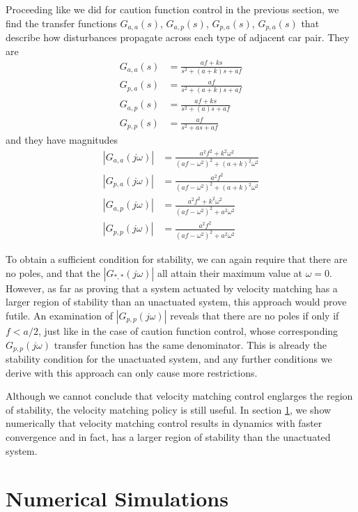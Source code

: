 \documentclass[10pt,twocolumn]{article}
\theoremstyle{ss}
\begin{document}
Proceeding like we did for caution function control in the previous section, we find the transfer functions $G_{a,a}(s)$, $G_{a,p}(s)$, $G_{p,a}(s)$, $G_{p,a}(s)$ that describe how disturbances propagate across each type of adjacent car pair. They are
\begin{align}
G_{a,a}(s) &= \frac{af + ks}{s^2 + (a+k)s + af}\\
G_{p,a}(s) &= \frac{af}{s^2 + (a+k)s + af}\\
G_{a,p}(s) &= \frac{af + ks}{s^2 + (a)s + af}\\
G_{p,p}(s) &= \frac{af}{s^2 + as + af}
\end{align}
and they have magnitudes
\begin{align}
|G_{a,a}(j\omega)| &= \frac{a^2f^2 + k^2\omega^2}{(af - \omega^2)^2 + (a+k)^2\omega^2}\\
|G_{p,a}(j\omega)| &= \frac{a^2f^2}{(af - \omega^2)^2 + (a+k)^2\omega^2}\\
|G_{a,p}(j\omega)| &= \frac{a^2f^2 + k^2\omega^2}{(af - \omega^2)^2 + a^2\omega^2}\\
|G_{p,p}(j\omega)| &= \frac{a^2f^2}{(af - \omega^2)^2 + a^2\omega^2}
\end{align}

To obtain a sufficient condition for stability, we can again require that there are no poles, and that the $|G_{*,*}(j\omega)|$ all attain their maximum value at $\omega=0$. However, as far as proving that a system actuated by velocity matching has a larger region of stability than an unactuated system, this approach would prove futile. An examination of $|G_{p,p}(j\omega)|$ reveals that there are no poles if only if $f < a/2$, just like in the case of caution function control, whose corresponding $G_{p,p}(j\omega)$ transfer function has the same denominator. This is already the stability condition for the unactuated system, and any further conditions we derive with this approach can only cause more restrictions. 

Although we cannot conclude that velocity matching control englarges the region of stability, the velocity matching policy is still useful. In section \ref{sec:numer}, we show numerically that velocity matching control results in dynamics with faster convergence and in fact, has a larger region of stability than the unactuated system.

\section{Numerical Simulations}
\label{sec:numer}
\end{document}
